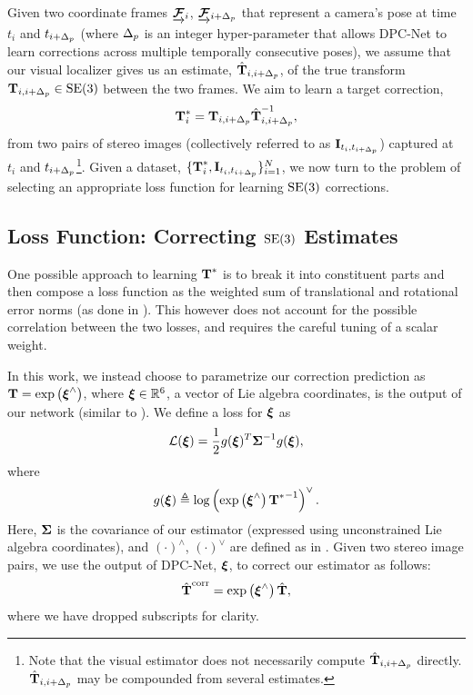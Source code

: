 Given two coordinate frames $\underrightarrow{ \boldsymbol{\mathbf{\mathcal{F}}} }_{i}$, $\underrightarrow{ \boldsymbol{\mathbf{\mathcal{F}}} }_{i+\Delta_p}$ that represent a camera's pose at time $t_{i}$ and $t_{i+\Delta_p}$ (where $\Delta_p$ is an integer hyper-parameter that allows DPC-Net to learn corrections across multiple temporally consecutive poses), we assume that our visual localizer gives us an estimate, $\hat{\boldsymbol{\mathbf{T}}}_{i,i+\Delta_p}$, of the true transform $\boldsymbol{\mathbf{T}}_{i,i+\Delta_p} \in \mathrm{SE}(3)$ between the two frames. We aim to learn a target correction,
\begin{equation}
	\boldsymbol{\mathbf{T}}^*_i = \boldsymbol{\mathbf{T}}_{i,i+\Delta_p} {\hat{\boldsymbol{\mathbf{T}}}_{i,i+\Delta_p}}^{-1},
\end{equation}
from two pairs of stereo images (collectively referred to as $\boldsymbol{\mathbf{I}}_{t_{i}, t_{i+\Delta_p}}$) captured at $t_{i}$ and $t_{i+\Delta_p}$\footnote{Note that the visual estimator does not necessarily compute $\hat{\boldsymbol{\mathbf{T}}}_{i,i+\Delta_p}$ directly. $\hat{\boldsymbol{\mathbf{T}}}_{i,i+\Delta_p}$ may be compounded from several estimates.}. Given a dataset, $\{ \boldsymbol{\mathbf{T}}^*_i, \boldsymbol{\mathbf{I}}_{t_{i}, t_{i+\Delta_p}} \}^N_{i=1}$,  we now turn to the problem of selecting an appropriate loss function for learning $\mathrm{SE}(3)$ corrections.

\subsection{Loss Function: Correcting $\mathrm{SE}(3)$ Estimates}

One possible approach to learning $\boldsymbol{\mathbf{T}}^*$ is to break it into constituent parts and then compose a loss function as the weighted sum of translational and rotational error norms (as done in \cite{Kendall2015-ew, Melekhov2017-dl, Oliveira2017-lt}). This however does not account for the possible correlation between the two losses, and requires the careful tuning of a scalar weight.

In this work, we instead choose to parametrize our correction prediction as $\boldsymbol{\mathbf{T}} = \mathrm{exp}\left({\boldsymbol{\mathbf{\xi}}}^{\wedge}\right)$, where $\boldsymbol{\mathbf{\xi}} \in \mathbb{R}^6$, a vector of Lie algebra coordinates, is the output of our network (similar to \cite{Handa2016-hm}). We define a loss for $\boldsymbol{\mathbf{\xi}}$ as 
\begin{equation}
	\label{eq:se3loss_fn}
\mathcal{L} (\boldsymbol{\mathbf{\xi}}) = \frac{1}{2} g({\boldsymbol{\mathbf{\xi}}})^T {\boldsymbol{\mathbf{\Sigma}}}^{-1} g({\boldsymbol{\mathbf{\xi}}}),
\end{equation} where 
\begin{equation}
	\label{eq:se3logmap_fn}
	g({\boldsymbol{\mathbf{\xi}}}) \triangleq \mathrm{log}\left({\mathrm{exp}\left({\boldsymbol{\mathbf{\xi}}}^{\wedge}\right) {\boldsymbol{\mathbf{T}}^*}^{-1}}\right)^{\vee}.
\end{equation}
Here, $\boldsymbol{\mathbf{\Sigma}}$ is the covariance of our estimator (expressed using unconstrained Lie algebra coordinates), and $(\cdot)^\wedge$, $(\cdot)^\vee$ are defined as in .
Given two stereo image pairs, we use the output of DPC-Net, $\boldsymbol{\mathbf{\xi}}$, to correct our estimator as follows:
\begin{align}
	\hat{\boldsymbol{\mathbf{T}}}^{\mathrm{corr}} = \mathrm{exp}\left({\boldsymbol{\mathbf{\xi}}}^{\wedge}\right) \hat{\boldsymbol{\mathbf{T}}},
\end{align}
where we have dropped subscripts for clarity.

